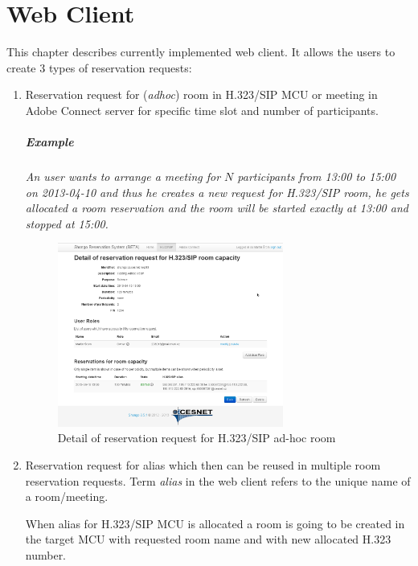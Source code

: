 \chapter{Web Client}

This chapter describes currently implemented web client. It allows the users to create 3 types of reservation requests:

\begin{enumerate}
\item Reservation request for (\textit{adhoc}) room in H.323/SIP MCU or meeting in Adobe Connect server for specific time slot and number of participants. 
\paragraph{Example}
\textit{An user wants to arrange a meeting for $N$ participants from 13:00 to 15:00 on 2013-04-10 and thus he creates a new request for H.323/SIP room, he gets allocated a room reservation and the room will be started exactly at 13:00 and stopped at 15:00.}

\begin{figure}[ht!]
\centering\includegraphics[width=0.7\textwidth]{images/client_web_detail_room.png}
\caption{Detail of reservation request for H.323/SIP ad-hoc room}
\label{fig:client-web-detail-room}
\end{figure}

\item Reservation request for alias which then can be reused in multiple room reservation requests. Term \textit{alias} in the web client refers to the unique name of a room/meeting.

When alias for H.323/SIP MCU is allocated a room is going to be created in the target MCU with requested room name and with new allocated H.323 number.


\end{enumerate}
